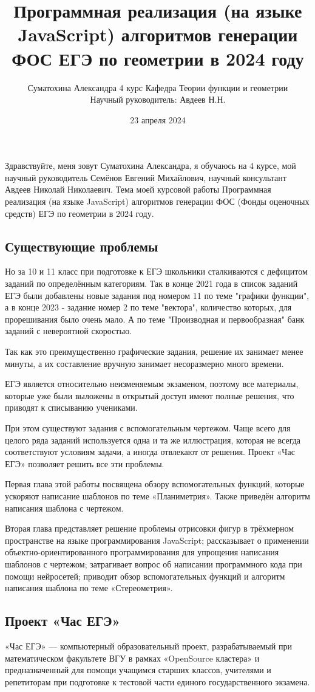 \documentclass[a4paper, 12pt]{extarticle}
\title{Программная реализация (на языке JavaScript) алгоритмов генерации ФОС ЕГЭ по геометрии в 2024 году}
\author{Суматохина Александра 4 курс Кафедра Теории функции и геометрии\\Научный руководитель: Авдеев Н.Н.}
\date{23 апреля 2024}
\begin{document}
\maketitle

Здравствуйте, меня зовут Суматохина Александра, я обучаюсь на 4 курсе, мой научный руководитель Семёнов Евгений Михайлович, научный консультант Авдеев Николай Николаевич. Тема моей курсовой работы Программная реализация (на языке JavaScript) алгоритмов генерации ФОС (Фонды оценочных средств) ЕГЭ по геометрии в 2024 году.

\subsection*{Существующие проблемы}
Но за 10 и 11 класс при подготовке к ЕГЭ школьники сталкиваются с дефицитом заданий по определённым категориям.
Так в конце 2021 года в список заданий ЕГЭ были добавлены новые задания под номером 11 по теме "графики функции", а в конце 2023 - задание номер 2 по теме "вектора", количество которых, для прорешивания было очень мало.
А по теме "Производная и первообразная" банк заданий с невероятной скоростью.

Так как это преимущественно графические задания, решение их занимает менее минуты, а их составление вручную занимает несоразмерно много времени.

ЕГЭ является относительно неизменяемым экзаменом, поэтому все материалы, которые уже были выложены в открытый доступ имеют полные решения, что приводят к списыванию учениками.

При этом существуют задания с вспомогательным чертежом. Чаще всего для целого ряда заданий используется одна и та же иллюстрация, которая не всегда соответствуют условиям задачи, а иногда отвлекают от решения.
Проект «Час ЕГЭ» позволяет решить все эти проблемы.

Первая глава этой работы посвящена обзору вспомогательных функций, которые ускоряют написание шаблонов по теме «Планиметрия». Также приведён алгоритм написания шаблона с чертежом.

Вторая глава представляет решение проблемы отрисовки фигур в трёхмерном пространстве на языке программирования JavaScript; рассказывает о применении объектно-ориентированного программирования для упрощения написания шаблонов с чертежом; затрагивает вопрос об написании программного кода при помощи нейросетей; приводит обзор вспомогательных функций и алгоритм написания шаблона по теме «Стереометрия».


\subsection*{Проект «Час ЕГЭ»}
«Час ЕГЭ» — компьютерный образовательный проект, разрабатываемый при математическом
факультете ВГУ в рамках «OpenSource кластера» и предназначенный для помощи учащимся
старших классов, учителями и репетиторам при подготовке к тестовой части единого государственного экзамена.
\end{document}
